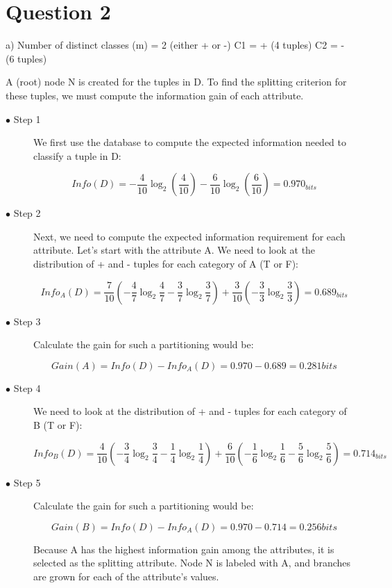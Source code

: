\documentclass[a4paper]{article}
\begin{document}
\maketitle

\section*{Question 2}
a)
\newline
Number of distinct classes (m) = 2 (either + or -)
\newline
C1 = + (4 tuples)
\newline
C2 = - (6 tuples)

A (root) node N is created for the tuples in D. To find the splitting criterion for these tuples, we must compute the information gain of each attribute.

\begin{description}
    \item[$\bullet$ Step 1] We first use the database to compute the expected information needed to classify a tuple in D:


    \[ Info(D)
      = - \dfrac{4}{10} \log _{2} \left(\dfrac{4}{10}\right) - \dfrac{6}{10} \log _{2} \left(\dfrac{6}{10}\right) = 0.970_{bits}
    \]
    \newpage
    \item[$\bullet$ Step 2] Next, we need to compute the expected information requirement for each attribute. Let’s start with the attribute A. We need to look at the distribution of + and - tuples for each category of A (T or F):

    \[ Info_A(D)
      = \dfrac{7}{10} \left(-\dfrac{4}{7} \log _{2} \dfrac{4}{7} - \dfrac{3}{7} \log _{2} \dfrac{3}{7} \right) +
      \dfrac{3}{10} \left(-\dfrac{3}{3} \log _{2} \dfrac{3}{3}\right)
      = 0.689 _{bits}
    \]


    \item[$\bullet$ Step 3] Calculate the gain for such a partitioning would be:

     \[ Gain(A)
      = Info(D) - Info_A(D) = 0.970 - 0.689 = 0.281 bits
    \]

    \item[$\bullet$ Step 4]  We need to look at the distribution of + and - tuples for each category of B (T or F):

    \[ Info_B(D)
      = \dfrac{4}{10} \left(-\dfrac{3}{4} \log _{2} \dfrac{3}{4} - \dfrac{1}{4} \log _{2} \dfrac{1}{4}\right) +
      \dfrac{6}{10} \left(-\dfrac{1}{6} \log _{2} \dfrac{1}{6} - \dfrac{5}{6} \log _{2} \dfrac{5}{6}\right)
      = 0.714_{bits}
    \]

    \item[$\bullet$ Step 5]  Calculate the gain for such a partitioning would be:

    \[ Gain(B)
      = Info(D) - Info_A(D) = 0.970 - 0.714 = 0.256 bits
    \]

    Because A has the highest information gain among the attributes, it is selected as the splitting attribute. Node N is labeled with A, and branches are grown for each of the attribute’s values.

\end{description}
\end{document}
